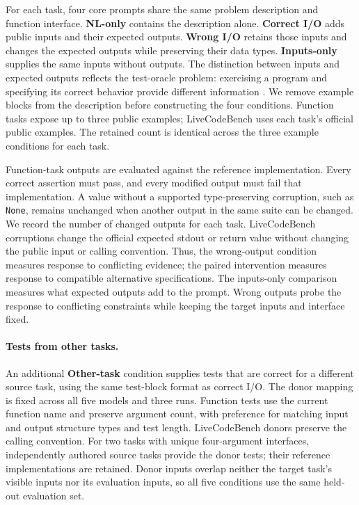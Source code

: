 \documentclass[acmsmall,screen,review,anonymous]{acmart}
\begin{document}
For each task, four core prompts share the same problem description and function interface.
\textbf{NL-only} contains the description alone.
\textbf{Correct I/O} adds public inputs and their expected outputs.
\textbf{Wrong I/O} retains those inputs and changes the expected outputs while preserving their data types.
\textbf{Inputs-only} supplies the same inputs without outputs.
The distinction between inputs and expected outputs reflects the test-oracle problem: exercising a program and specifying its correct behavior provide different information \citep{barr2015oracle}.
We remove example blocks from the description before constructing the four conditions.
Function tasks expose up to three public examples; LiveCodeBench uses each task's official public examples.
The retained count is identical across the three example conditions for each task.

Function-task outputs are evaluated against the reference implementation.
Every correct assertion must pass, and every modified output must fail that implementation.
A value without a supported type-preserving corruption, such as \texttt{None}, remains unchanged when another output in the same suite can be changed.
We record the number of changed outputs for each task.
LiveCodeBench corruptions change the official expected stdout or return value without changing the public input or calling convention.
Thus, the wrong-output condition measures response to conflicting evidence; the paired intervention measures response to compatible alternative specifications.
The inputs-only comparison measures what expected outputs add to the prompt.
Wrong outputs probe the response to conflicting constraints while keeping the target inputs and interface fixed.


\paragraph{Tests from other tasks.}
An additional \textbf{Other-task} condition supplies tests that are correct for a different source task, using the same test-block format as correct I/O.
The donor mapping is fixed across all five models and three runs.
Function tests use the current function name and preserve argument count, with preference for matching input and output structure types and test length.
LiveCodeBench donors preserve the calling convention.
For two tasks with unique four-argument interfaces, independently authored source tasks provide the donor tests; their reference implementations are retained.
Donor inputs overlap neither the target task's visible inputs nor its evaluation inputs, so all five conditions use the same held-out evaluation set.
\end{document}

